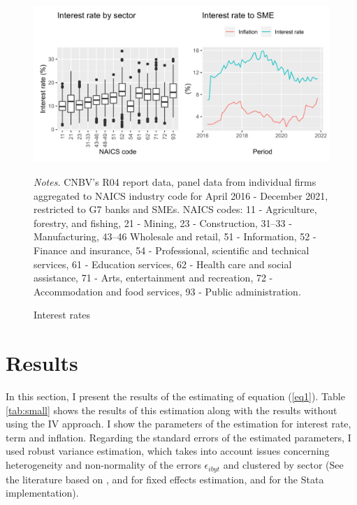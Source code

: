 \documentclass[11pt, oneside]{book}
\newcommand\fnote[1]{\captionsetup{font=footnotesize}\caption*{#1}}
\begin{document}
\begin{figure}[H]
\captionsetup{font=footnotesize}
\begin{center}
\includegraphics[scale=.7]{Imagenes/Interest_rates.png}
\caption{Interest rates}
\fnote{\textit{Notes.} CNBV's R04 report data, panel data from individual firms aggregated to NAICS industry code for April 2016 - December 2021, restricted to G7 banks and SMEs.  NAICS codes: 11 - Agriculture, forestry, and fishing, 21 - Mining, 23 - Construction, 31--33 - Manufacturing, 43--46 Wholesale and retail, 51 - Information, 52 - Finance and insurance, 54 - Professional, scientific and technical services, 61 - Education services, 62 - Health care and social assistance, 71 - Arts, entertainment and recreation, 72 - Accommodation and food services, 93 - Public administration.}
\label{Fig_Interest}
\end{center}
\end{figure}



\chapter{Results} \label{sect5}

In this section, I present the results of the estimating of equation (\ref{eq1}). Table \ref{tab:small} shows the results of this estimation along with the results without using the IV approach. I show the parameters of the estimation for interest rate, term and inflation. Regarding the standard errors of the estimated parameters, I used robust variance estimation, which takes into account issues concerning heterogeneity and non-normality of the errors $\epsilon_{ibyt}$ and clustered by sector (See the literature based on \cite{arellano1987computing}, \cite{cameron2005microeconometrics} and \cite{wooldridge2010econometric} for fixed effects estimation, and \cite{rogers1994regression} for the Stata implementation).  
\end{document}
